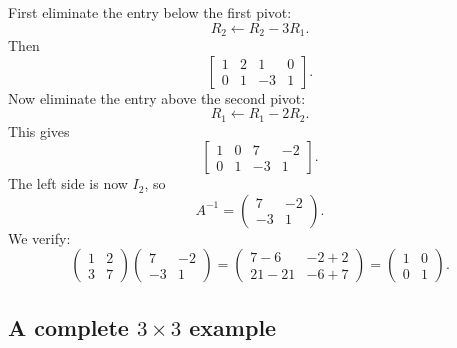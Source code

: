 First eliminate the entry below the first pivot:
\[
R_2\leftarrow R_2-3R_1.
\]
Then
\[
\left[\begin{array}{cc|cc}
1&2&1&0\\
0&1&-3&1
\end{array}\right].
\]
Now eliminate the entry above the second pivot:
\[
R_1\leftarrow R_1-2R_2.
\]
This gives
\[
\left[\begin{array}{cc|cc}
1&0&7&-2\\
0&1&-3&1
\end{array}\right].
\]
The left side is now \(I_2\), so
\[
A^{-1}=\begin{pmatrix}7&-2\\-3&1\end{pmatrix}.
\]
We verify:
\[
\begin{pmatrix}1&2\\3&7\end{pmatrix}
\begin{pmatrix}7&-2\\-3&1\end{pmatrix}
=
\begin{pmatrix}
7-6&-2+2\\
21-21&-6+7
\end{pmatrix}
=
\begin{pmatrix}1&0\\0&1\end{pmatrix}.
\]

\subsection{A complete \(3\times3\) example}

